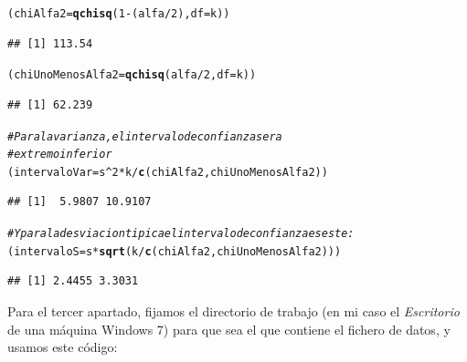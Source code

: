 \documentclass[10pt,a4paper]{article}\usepackage[]{graphicx}\usepackage[]{color}
\makeatletter
\newcommand{\hlnum}[1]{\textcolor[rgb]{0.686,0.059,0.569}{#1}}%
\newcommand{\hlcom}[1]{\textcolor[rgb]{0.678,0.584,0.686}{\textit{#1}}}%
\newcommand{\hlopt}[1]{\textcolor[rgb]{0,0,0}{#1}}%
\newcommand{\hlstd}[1]{\textcolor[rgb]{0.345,0.345,0.345}{#1}}%
\newcommand{\hlkwb}[1]{\textcolor[rgb]{0.69,0.353,0.396}{#1}}%
\newcommand{\hlkwc}[1]{\textcolor[rgb]{0.333,0.667,0.333}{#1}}%
\newcommand{\hlkwd}[1]{\textcolor[rgb]{0.737,0.353,0.396}{\textbf{#1}}}%
\newenvironment{kframe}{%
 \def\at@end@of@kframe{}%
 \ifinner\ifhmode%
  \def\at@end@of@kframe{\end{minipage}}%
  \begin{minipage}{\columnwidth}%
 \fi\fi%
 \def\FrameCommand##1{\hskip\@totalleftmargin \hskip-\fboxsep
 \colorbox{shadecolor}{##1}\hskip-\fboxsep
     \hskip-\linewidth \hskip-\@totalleftmargin \hskip\columnwidth}%
 \MakeFramed {\advance\hsize-\width
   \@totalleftmargin\z@ \linewidth\hsize
   \@setminipage}}%
 {\par\unskip\endMakeFramed%
 \at@end@of@kframe}
\newenvironment{knitrout}{}{} %
\newcounter {cont01}
\makeatother
\begin{document}
\begin{knitrout}
\begin{kframe}
\begin{alltt}
\hlstd{(chiAlfa2} \hlkwb{=} \hlkwd{qchisq}\hlstd{(}\hlnum{1} \hlopt{-} \hlstd{(alfa}\hlopt{/}\hlnum{2}\hlstd{),} \hlkwc{df}\hlstd{=k))}
\end{alltt}
\begin{verbatim}
## [1] 113.54
\end{verbatim}
\begin{alltt}
\hlstd{(chiUnoMenosAlfa2} \hlkwb{=} \hlkwd{qchisq}\hlstd{(alfa}\hlopt{/}\hlnum{2}\hlstd{,} \hlkwc{df}\hlstd{=k))}
\end{alltt}
\begin{verbatim}
## [1] 62.239
\end{verbatim}
\begin{alltt}
\hlcom{#Para la varianza, el intervalo de confianza sera}
\hlcom{# extremo inferior}
\hlstd{(intervaloVar} \hlkwb{=} \hlstd{s}\hlopt{^}\hlnum{2} \hlopt{*} \hlstd{k} \hlopt{/} \hlkwd{c}\hlstd{(chiAlfa2, chiUnoMenosAlfa2))}
\end{alltt}
\begin{verbatim}
## [1]  5.9807 10.9107
\end{verbatim}
\begin{alltt}
\hlcom{# Y para la desviacion tipica el intervalo de confianza es este:}
\hlstd{(intervaloS} \hlkwb{=} \hlstd{s} \hlopt{*} \hlkwd{sqrt}\hlstd{(k} \hlopt{/} \hlkwd{c}\hlstd{(chiAlfa2, chiUnoMenosAlfa2)))}
\end{alltt}
\begin{verbatim}
## [1] 2.4455 3.3031
\end{verbatim}
\end{kframe}
\end{knitrout}
Para el tercer apartado, fijamos el directorio de trabajo (en mi caso el {\em Escritorio} de una máquina Windows 7) para que sea el que contiene el fichero de datos, y usamos este código:
\end{document}
